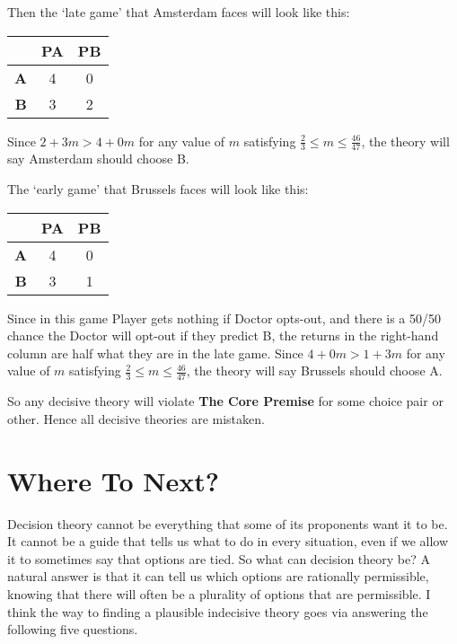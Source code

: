 \documentclass[
  12pt,
]{article}
\begin{document}
Then the `late game' that Amsterdam faces will look like this:

\begin{table}[H]
\centering
\begin{tabular}[t]{>{}r|cc}

\textbf{ } & \textbf{PA} & \textbf{PB}\\
\midrule
\textbf{A} & 4 & 0\\
\textbf{B} & 3 & 2\\

\end{tabular}
\end{table}

Since \(2 + 3m > 4 + 0m\) for any value of \(m\) satisfying
\(\frac{2}{3} \leq m \leq \frac{46}{47}\), the theory will say Amsterdam
should choose B.

The `early game' that Brussels faces will look like this:

\begin{table}[H]
\centering
\begin{tabular}[t]{>{}r|cc}

\textbf{ } & \textbf{PA} & \textbf{PB}\\
\midrule
\textbf{A} & 4 & 0\\
\textbf{B} & 3 & 1\\

\end{tabular}
\end{table}

Since in this game Player gets nothing if Doctor opts-out, and there is
a 50/50 chance the Doctor will opt-out if they predict B, the returns in
the right-hand column are half what they are in the late game. Since
\(4 + 0m > 1 + 3m\) for any value of \(m\) satisfying
\(\frac{2}{3} \leq m \leq \frac{46}{47}\), the theory will say Brussels
should choose A.

So any decisive theory will violate \textbf{The Core Premise} for some
choice pair or other. Hence all decisive theories are mistaken.

\hypertarget{where-to-next}{%
\section{Where To Next?}\label{where-to-next}}

Decision theory cannot be everything that some of its proponents want it
to be. It cannot be a guide that tells us what to do in every situation,
even if we allow it to sometimes say that options are tied. So what can
decision theory be? A natural answer is that it can tell us which
options are rationally permissible, knowing that there will often be a
plurality of options that are permissible. I think the way to finding a
plausible indecisive theory goes via answering the following five
questions.
\end{document}
